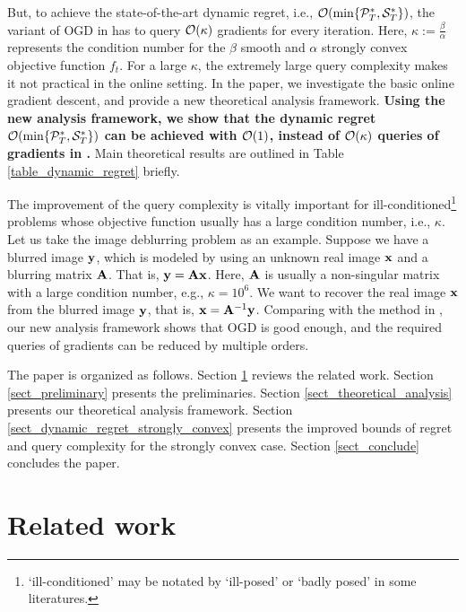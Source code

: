 \documentclass{article}
\begin{document}
But, to achieve the state-of-the-art dynamic regret, i.e., ${\mathcal{O}}(\min\{{\mathcal{P}}_T^{\ast}, {\mathcal{S}}_T^{\ast}\})$, the variant of OGD in \cite{Zhang:2016wl} has to query  ${\mathcal{O}}(\kappa)$ gradients for every iteration. Here, $\kappa := \frac{\beta}{\alpha}$ represents the condition number for the $\beta$ smooth and $\alpha$ strongly convex objective function $f_t$. For a large $\kappa$, the extremely large query complexity makes it not practical in the online setting. In the paper, we investigate the basic online gradient descent, and provide a new theoretical analysis framework. \textbf{Using the new analysis framework, we show that the dynamic regret ${\mathcal{O}}(\min\{{\mathcal{P}}_T^{\ast}, {\mathcal{S}}_T^{\ast}\})$ can be achieved with ${\mathcal{O}}(1)$, instead of  ${\mathcal{O}}(\kappa)$ queries of gradients in \cite{Zhang:2016wl}.}  Main theoretical results are outlined in Table \ref{table_dynamic_regret} briefly.  

The improvement of the query complexity is vitally important for ill-conditioned\footnote{`ill-conditioned' may be notated by `ill-posed' or `badly posed' in some literatures.} problems \cite{Tarantola:2004:IPT} whose objective function usually has a large condition number, i.e., $\kappa$. Let us take the image deblurring problem as an example.  Suppose we have a blurred image ${\bf y}$, which is modeled by using an unknown real image ${\bf x}$ and a blurring matrix ${\bf A}$. That is, ${\bf y} = {\bf A} {\bf x}$. Here, ${\bf A}$ is usually a non-singular matrix with a large condition number, e.g., $\kappa = 10^6$. We want to recover the real image ${\bf x}$ from the blurred image ${\bf y}$, that is, ${\bf x} = {\bf A}^{-1}{\bf y}$. Comparing with the method in \cite{Zhang:2016wl}, our new analysis framework shows that OGD is good enough, and the required queries of gradients can be reduced by multiple orders.     


The paper is organized as follows. Section \ref{sect_related_work} reviews the related work. Section \ref{sect_preliminary} presents the preliminaries. Section \ref{sect_theoretical_analysis} presents our theoretical analysis framework. Section \ref{sect_dynamic_regret_strongly_convex} presents the improved bounds of regret and query complexity for the strongly convex case. Section \ref{sect_conclude} concludes the paper. 



\section{Related work}
\label{sect_related_work}
\end{document}
